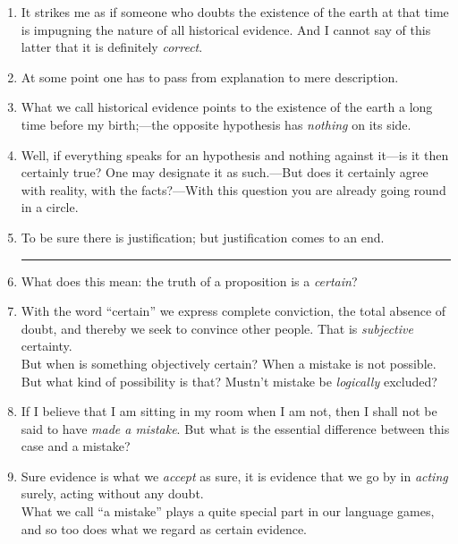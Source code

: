 \documentclass{book}
\begin{document}
\begin{enumerate}
\item
It strikes me as if someone who doubts the existence of the earth at that time
is impugning the nature of all historical evidence. And I cannot say of this
latter that it is definitely \emph{correct}.

\item
At some point one has to pass from explanation to mere description.

\item
What we call historical evidence points to the existence of the earth a long
time before my birth;---the opposite hypothesis has \emph{nothing} on its side.

\item
Well, if everything speaks for an hypothesis and nothing against it---is it
then certainly true? One may designate it as such.---But does it certainly
agree with reality, with the facts?---With this question you are already going
round in a circle.

\item
To be sure there is justification; but justification comes to an end.

\begin{center}\rule{0.5\linewidth}{\linethickness}\end{center}

\item
What does this mean: the truth of a proposition is a \emph{certain}?

\item
With the word ``certain'' we express complete conviction, the total absence of
doubt, and thereby we seek to convince other people. That is \emph{subjective}
certainty. \\
But when is something objectively certain? When a mistake is not possible. But
what kind of possibility is that? Mustn't mistake be \emph{logically} excluded?

\item
If I believe that I am sitting in my room when I am not, then I shall not be
said to have \emph{made a mistake}. But what is the essential difference
between this case and a mistake?

\item
Sure evidence is what we \emph{accept} as sure, it is evidence that we go by in
\emph{acting} surely, acting without any doubt. \\
What we call ``a mistake'' plays a quite special part in our language games,
and so too does what we regard as certain evidence.


\end{enumerate}
\end{document}
